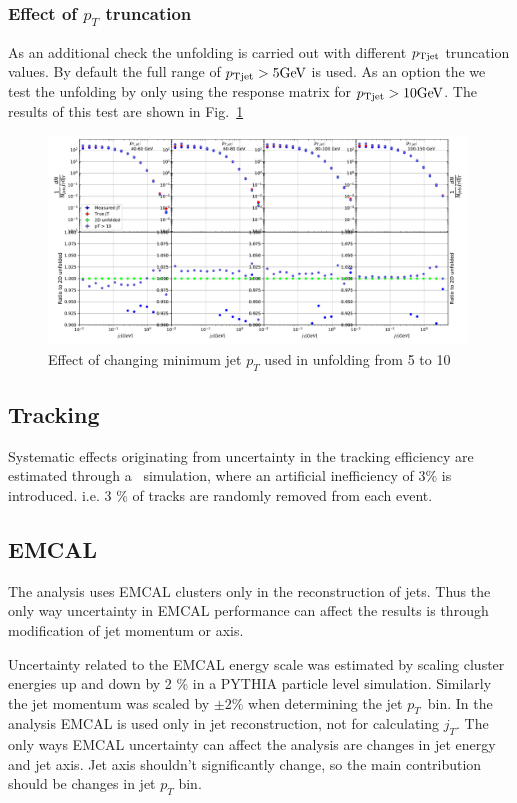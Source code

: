 \subsubsection{Effect of $p_T$ truncation}
\label{sec:truncation}
As an additional check the unfolding is carried out with different $p_{\rm Tjet}$ truncation values. By default the full range of $p_{\rm Tjet} > 5 \mathrm{GeV}\kern-0.05em$ is used. As an option the we test the unfolding by only using the response matrix for $p_{\rm Tjet} > 10 \mathrm{GeV}\kern-0.05em$. The results of this test are shown in Fig.~\ref{fig:truncation}

\begin{figure}
\includegraphics[width=0.99\textwidth]{figures/systematics/PtCutComparison10.pdf}
\caption{Effect of changing minimum jet $p_T$ used in unfolding from 5 to 10 \gev}
\label{fig:truncation}
\end{figure}


  
  
  \subsection{Tracking}
 Systematic effects originating from uncertainty in the tracking efficiency are estimated through a \pythia~simulation, where an artificial inefficiency of 3\% is introduced. i.e. 3 \% of tracks are randomly removed from each event. 
  \subsection{EMCAL}
  The analysis uses EMCAL clusters only in the reconstruction of jets. Thus the only way uncertainty in EMCAL performance can affect the results is through modification of jet momentum or axis.
  
  Uncertainty related to the EMCAL energy scale was estimated by scaling cluster energies up and down by 2 \% in a PYTHIA particle level simulation. Similarly the jet momentum was scaled by $\pm 2\%$ when determining the jet $p_T$ bin. In the analysis EMCAL is used only in jet reconstruction, not for calculating $j_T$. The only ways EMCAL uncertainty can affect the analysis are changes in jet energy and jet axis. Jet axis shouldn't significantly change, so the main contribution should be changes in jet $p_T$ bin.


